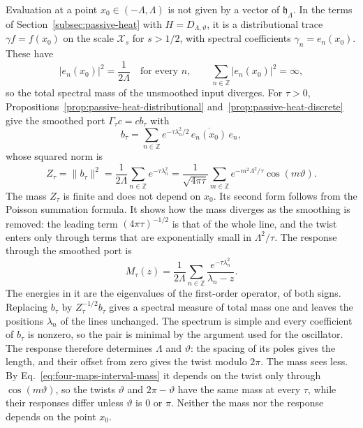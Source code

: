 Evaluation at a point $x_0\in(-\Lambda,\Lambda)$ is not given by a vector of $\mathfrak h_\Lambda$. In the terms of Section~\ref{subsec:passive-heat} with $H=D_{\Lambda,\vartheta}$, it is a distributional trace $\gamma f=f(x_0)$ on the scale $\mathcal X_s$ for $s>1/2$, with spectral coefficients $\gamma_n=e_n(x_0)$. These have
\begin{equation}
 |e_n(x_0)|^2=\frac{1}{2\Lambda}\quad\text{for every }n,\qquad\sum_{n\in\mathbb Z}|e_n(x_0)|^2=\infty ,
 \label{eq:four-maps-interval-point}
\end{equation}
so the total spectral mass of the unsmoothed input diverges. For $\tau>0$, Propositions~\ref{prop:passive-heat-distributional} and~\ref{prop:passive-heat-discrete} give the smoothed port $\Gamma_\tau c=cb_\tau$ with
\begin{equation}
 b_\tau=\sum_{n\in\mathbb Z}e^{-\tau\lambda_n^2/2}\,\overline{e_n(x_0)}\,e_n ,
 \label{eq:four-maps-interval-port}
\end{equation}
whose squared norm is
\begin{equation}
 Z_\tau=\|b_\tau\|^2=\frac{1}{2\Lambda}\sum_{n\in\mathbb Z}e^{-\tau\lambda_n^2}
   =\frac{1}{\sqrt{4\pi\tau}}\sum_{m\in\mathbb Z}e^{-m^2\Lambda^2/\tau}\cos(m\vartheta).
 \label{eq:four-maps-interval-mass}
\end{equation}
The mass $Z_\tau$ is finite and does not depend on $x_0$. Its second form follows from the Poisson summation formula. It shows how the mass diverges as the smoothing is removed: the leading term $(4\pi\tau)^{-1/2}$ is that of the whole line, and the twist enters only through terms that are exponentially small in $\Lambda^2/\tau$. The response through the smoothed port is
\begin{equation}
 M_\tau(z)=\frac{1}{2\Lambda}\sum_{n\in\mathbb Z}\frac{e^{-\tau\lambda_n^2}}{\lambda_n-z}.
 \label{eq:four-maps-interval-response}
\end{equation}
The energies in it are the eigenvalues of the first-order operator, of both signs. Replacing $b_\tau$ by $Z_\tau^{-1/2}b_\tau$ gives a spectral measure of total mass one and leaves the positions $\lambda_n$ of the lines unchanged. The spectrum is simple and every coefficient of $b_\tau$ is nonzero, so the pair is minimal by the argument used for the oscillator. The response therefore determines $\Lambda$ and $\vartheta$: the spacing of its poles gives the length, and their offset from zero gives the twist modulo $2\pi$. The mass sees less. By Eq.~\eqref{eq:four-maps-interval-mass} it depends on the twist only through $\cos(m\vartheta)$, so the twists $\vartheta$ and $2\pi-\vartheta$ have the same mass at every $\tau$, while their responses differ unless $\vartheta$ is $0$ or $\pi$. Neither the mass nor the response depends on the point $x_0$.

